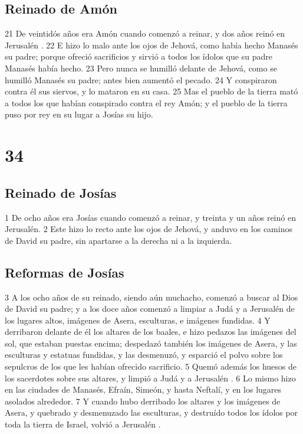 \section*{Reinado de Amón }

 
21 De veintidós años era Amón cuando comenzó a reinar, y dos años reinó en Jerusalén .
22 E hizo lo malo ante los ojos de Jehová, como había hecho Manasés su padre; porque ofreció sacrificios y sirvió a todos los ídolos que su padre Manasés había hecho.
23 Pero nunca se humilló delante de Jehová, como se humilló Manasés su padre; antes bien aumentó el pecado.
24 Y conspiraron contra él sus siervos, y lo mataron en su casa.
25 Mas el pueblo de la tierra mató a todos los que habían conspirado contra el rey Amón; y el pueblo de la tierra puso por rey en su lugar a Josías su hijo.

\chapter{34}

\section*{Reinado de Josías }

 

1 De ocho años era Josías cuando comenzó a reinar, y treinta y un años reinó en Jerusalén. 
2 Este hizo lo recto ante los ojos de Jehová, y anduvo en los caminos de David su padre, sin apartarse a la derecha ni a la izquierda.
\section*{Reformas de Josías }

 
3 A los ocho años de su reinado, siendo aún muchacho, comenzó a buscar al Dios de David su padre; y a los doce años comenzó a limpiar a Judá y a Jerusalén  de los lugares altos, imágenes de Asera, esculturas, e imágenes fundidas.
4 Y derribaron delante de él los altares de los baales, e hizo pedazos las imágenes del sol, que estaban puestas encima; despedazó también los imágenes de Asera, y las esculturas y estatuas fundidas, y las desmenuzó, y esparció el polvo sobre los sepulcros de los que les habían ofrecido sacrificio.
5 Quemó además los huesos de los sacerdotes sobre sus altares, y limpió a Judá y a Jerusalén .
6 Lo mismo hizo en las ciudades de Manasés, Efraín, Simeón, y hasta Neftalí, y en los lugares asolados alrededor.
7 Y cuando hubo derribado los altares y los imágenes de Asera, y quebrado y desmenuzado las esculturas, y destruído todos los ídolos por toda la tierra de Israel, volvió a Jerusalén .
